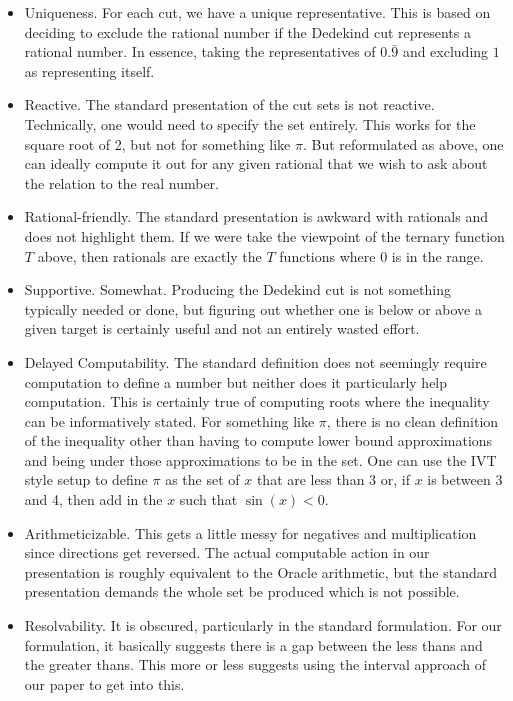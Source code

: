 \documentclass[12pt]{article}
\theoremstyle{remark}
\begin{document}
\begin{itemize}
    \item Uniqueness. For each cut, we have a unique representative. This is based on deciding to exclude the rational number if the Dedekind cut represents a rational number. In essence, taking the representatives of $0.\bar{9}$ and excluding $1$ as representing itself. 
    \item Reactive. The standard presentation of the cut sets is not reactive. Technically, one would need to specify the set entirely. This works for the square root of 2, but not for something like $\pi$. But reformulated as above, one can ideally compute it out for any given rational that we wish to ask about the relation to the real number. 
    \item Rational-friendly. The standard presentation is awkward with rationals and does not highlight them. If we were take the viewpoint of the ternary function $T$ above, then rationals are exactly the $T$ functions where $0$ is in the range. 
    \item Supportive. Somewhat. Producing the Dedekind cut is not something typically needed or done, but figuring out whether one is below or above a given target is certainly useful and not an entirely wasted effort. 
    \item Delayed Computability. The standard definition does not seemingly require computation to define a number but neither does it particularly help computation. This is certainly true of computing roots where the inequality can be informatively stated. For something like $\pi$, there is no clean definition of the inequality other than having to compute lower bound approximations and being under those approximations to be in the set. One can use the IVT style setup to define $\pi$ as the set of $x$ that are less than 3 or, if $x$ is between 3 and 4, then add in the $x$ such that $\sin(x) < 0$. 
    \item Arithmeticizable. This gets a little messy for negatives and multiplication since directions get reversed. The actual computable action in our presentation is roughly equivalent to the Oracle arithmetic, but the standard presentation demands the whole set be produced which is not possible.
    \item Resolvability. It is obscured, particularly in the standard formulation. For our formulation, it basically suggests there is a gap between the less thans and the greater thans. This more or less suggests using the interval approach of our paper to get into this. 
\end{itemize}
\end{document}
